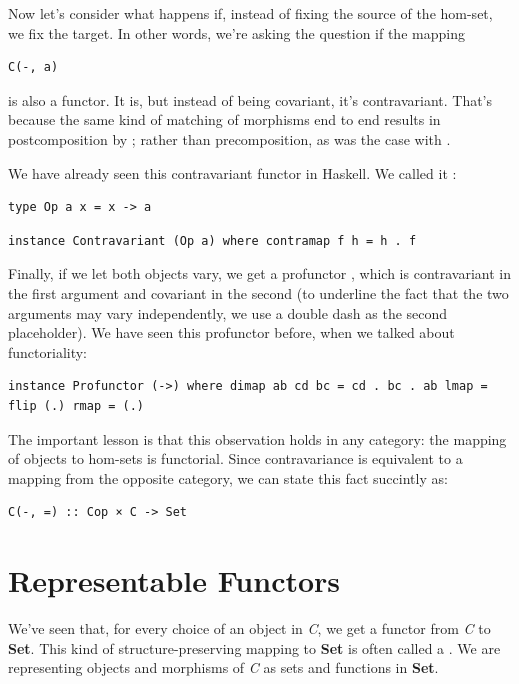 Now let's consider what happens if, instead of fixing the source of the
hom-set, we fix the target. In other words, we're asking the question if
the mapping

\begin{verbatim}
C(-, a)
\end{verbatim}

is also a functor. It is, but instead of being covariant, it's
contravariant. That's because the same kind of matching of morphisms end
to end results in postcomposition by ; rather than
precomposition, as was the case with .

We have already seen this contravariant functor in Haskell. We called it
:

\begin{verbatim}
type Op a x = x -> a
\end{verbatim}

\begin{verbatim}
instance Contravariant (Op a) where contramap f h = h . f
\end{verbatim}

Finally, if we let both objects vary, we get a profunctor
, which is contravariant in the first argument and
covariant in the second (to underline the fact that the two arguments
may vary independently, we use a double dash as the second placeholder).
We have seen this profunctor before, when we talked about functoriality:

\begin{verbatim}
instance Profunctor (->) where dimap ab cd bc = cd . bc . ab lmap = flip (.) rmap = (.)
\end{verbatim}

The important lesson is that this observation holds in any category: the
mapping of objects to hom-sets is functorial. Since contravariance is
equivalent to a mapping from the opposite category, we can state this
fact succintly as:

\begin{verbatim}
C(-, =) :: Cop × C -> Set
\end{verbatim}

\section{Representable Functors}\label{representable-functors}

We've seen that, for every choice of an object  in \emph{C},
we get a functor from \emph{C} to \textbf{Set}. This kind of
structure-preserving mapping to \textbf{Set} is often called a
. We are representing objects and morphisms of
\emph{C} as sets and functions in \textbf{Set}.

